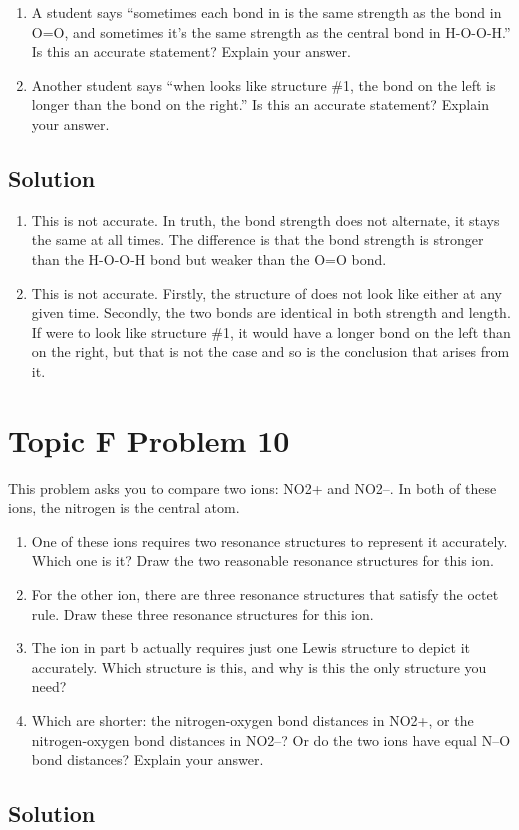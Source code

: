 \documentclass[10pt]{article}
\begin{document}
        \begin{enumerate}[label=\alph*)]
            \item   A student says “sometimes each bond in  is the same strength as the bond in O=O, and sometimes it's the same strength as the central bond in H-O-O-H.” 
                Is this an accurate statement? 
                Explain your answer.
            \item   Another student says “when  looks like structure \#1, the bond on the left is longer than the bond on the right.” 
                Is this an accurate statement? 
                Explain your answer.
        \end{enumerate}
        
        \subsection{Solution}
            \begin{enumerate}[label=\alph*/]
                \item   This is not accurate. In truth, the bond strength does not alternate, it stays the same at all times. The difference is that the bond strength is stronger than the H-O-O-H bond but weaker than the O=O bond.
                \item   This is not accurate. Firstly, the structure of  does not look like either at any given time. Secondly, the two bonds are identical in both strength and length. If  were to look like structure \#1, it would have a longer bond on the left than on the right, but that is not the case and so is the conclusion that arises from it.
            \end{enumerate}


    \pagebreak
    \section{Topic F Problem 10}
        This problem asks you to compare two ions: NO2+ and NO2–. In both of these ions, the nitrogen is the central atom.
        \begin{enumerate}[label=\alph*)]
            \item   One of these ions requires two resonance structures to represent it accurately. Which one is it? Draw the two reasonable resonance structures for this ion.
            \item   For the other ion, there are three resonance structures that satisfy the octet rule. Draw these three resonance structures for this ion.
            \item   The ion in part b actually requires just one Lewis structure to depict it accurately. Which structure is this, and why is this the only structure you need?
            \item   Which are shorter: the nitrogen-oxygen bond distances in NO2+, or the nitrogen-oxygen bond distances in NO2–? Or do the two ions have equal N–O bond distances? Explain your answer.
        \end{enumerate}
        
        \subsection{Solution}

    \pagebreak
    \tableofcontents
\end{document}
